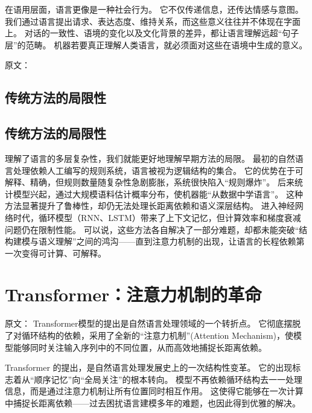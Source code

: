 在语用层面，语言更像是一种社会行为。  
它不仅传递信息，还传达情感与意图。  
我们通过语言提出请求、表达态度、维持关系，而这些意义往往并不体现在字面上。  
对话的一致性、语境的变化以及文化背景的差异，都让语言理解远超“句子层”的范畴。  
机器若要真正理解人类语言，就必须面对这些在语境中生成的意义。  



原文：
\subsection{传统方法的局限性}

\subsection{传统方法的局限性}

理解了语言的多层复杂性，我们就能更好地理解早期方法的局限。  
最初的自然语言处理依赖人工编写的规则系统，语言被视为逻辑结构的集合。  
它的优势在于可解释、精确，但规则数量随复杂性急剧膨胀，系统很快陷入“规则爆炸”。  
后来统计模型兴起，通过大规模语料估计概率分布，使机器能“从数据中学语言”。  
这种方法显著提升了鲁棒性，却仍无法处理长距离依赖和语义深层结构。  
进入神经网络时代，循环模型（RNN、LSTM）带来了上下文记忆，但计算效率和梯度衰减问题仍在限制性能。  
可以说，这些方法各自解决了一部分难题，却都未能突破“结构建模与语义理解”之间的鸿沟——直到注意力机制的出现，让语言的长程依赖第一次变得可计算、可解释。  


\section{Transformer：注意力机制的革命}



原文：
Transformer模型的提出是自然语言处理领域的一个转折点。  
它彻底摆脱了对循环结构的依赖，采用了全新的“注意力机制”(Attention Mechanism)，使模型能够同时关注输入序列中的不同位置，从而高效地捕捉长距离依赖。  

Transformer 的提出，是自然语言处理发展史上的一次结构性变革。  
它的出现标志着从“顺序记忆”向“全局关注”的根本转向。  
模型不再依赖循环结构去一一处理信息，而是通过注意力机制让所有位置同时相互作用。  
这使得它能够在一次计算中捕捉长距离依赖——过去困扰语言建模多年的难题，也因此得到优雅的解决。  




